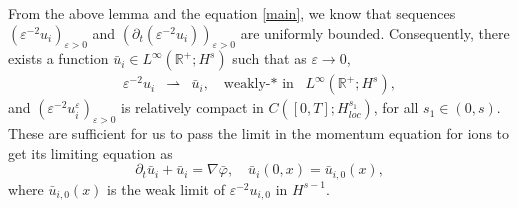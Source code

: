 \documentclass[reqno,twoside,12pt,a4paper]{amsart}
\newcommand{\R}{\mathbb{R}}
\newcommand{\eps}{\mathbb{\varepsilon}}
\newcommand{\pt}{\partial_t}
\newcommand{\D}{\nabla}
\newcommand{\vp}{\varphi}
\numberwithin{equation}{section}
\begin{document}
From the above lemma and the equation \eqref{main}, we know that sequences $(\eps^{-2}u_i)_{\eps>0}$ and $(\pt(\eps^{-2}u_i))_{\eps>0}$ are uniformly bounded. Consequently, there exists a function $\bar{u}_i\in L^\infty(\R^+; H^{s})$ such that as $\eps\to 0$, 
\begin{eqnarray}\label{converui}
\eps^{-2}u_i&\rightharpoonup& \bar{u}_i, \quad \text{weakly-* in } \,\,\, L^\infty(\R^+;H^s),
\end{eqnarray}
and $(\eps^{-2}u_i^\eps)_{\eps>0}$ is relatively compact in $C([0,T];H_{loc}^{s_1})$, for all $s_1\in(0,s)$. These are sufficient for us to pass the limit in the momentum equation for ions to get its limiting equation as 
\begin{equation}\label{bu}
\pt \bar{u}_i+\bar{u}_i=\D\bar{\vp}, \quad \bar{u}_i(0,x)=\bar{u}_{i,0}(x),
\end{equation}
where $\bar{u}_{i,0}(x)$ is the weak limit of $\eps^{-2}u_{i,0}$ in $H^{s-1}$. 
\end{document}
